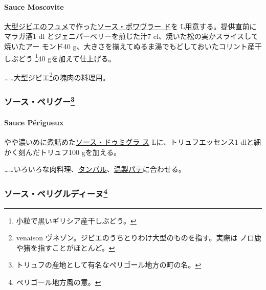 \hypertarget{sauce-moscovite}{%
\paragraph{Sauce Moscovite}\label{sauce-moscovite}}

   

\protect\hyperlink{fonds-de-gibier}{大型ジビエのフュメ}で作った\protect\hyperlink{sauce-poivrade}{ソース・ポワヴラー
ド}を\troisquarts{} L用意する。提供直前にマラガ酒1 dl
とジェニパーベリーを煎じた汁7 cl、焼いた松の実かスライスして焼いたアー
モンド40 g、大きさを揃えてぬるま湯でもどしておいたコリント産干しぶどう
\footnote{小粒で黒いギリシア産干しぶどう。}40 gを加えて仕上げる。

\ldots{}\ldots{}大型ジビエ\footnote{venaison
  ヴネゾン。ジビエのうちとりわけ大型のものを指す。実際は
  ノロ鹿や猪を指すことがほとんど。}の塊肉の料理用。

\maeaki

\hypertarget{ux30bdux30fcux30b9ux30daux30eaux30b0ux30fc59}{%
\subsubsection[ソース・ペリグー]{\texorpdfstring{ソース・ペリグー\footnote{トリュフの産地として有名なペリゴール地方の町の名。}}{ソース・ペリグー}}\label{ux30bdux30fcux30b9ux30daux30eaux30b0ux30fc59}}

\hypertarget{sauce-perigueux}{%
\paragraph{Sauce Périgueux}\label{sauce-perigueux}}

  

やや濃いめに煮詰めた\protect\hyperlink{sauce-demi-glace}{ソース・ドゥミグラ
ス}\troisquarts{} Lに、トリュフエッセンス1 \undemi{}
dlと細かく刻んだトリュフ100 gを加える。

\ldots{}\ldots{}いろいろな肉料理、\href{}{タンバル}、\href{}{温製パテ}に合わせる。

\maeaki

\hypertarget{ux30bdux30fcux30b9ux30daux30eaux30b0ux30ebux30c7ux30a3ux30fcux30cc60}{%
\subsubsection[ソース・ペリグルディーヌ]{\texorpdfstring{ソース・ペリグルディーヌ\footnote{ペリゴール地方風の意。}}{ソース・ペリグルディーヌ}}\label{ux30bdux30fcux30b9ux30daux30eaux30b0ux30ebux30c7ux30a3ux30fcux30cc60}}

